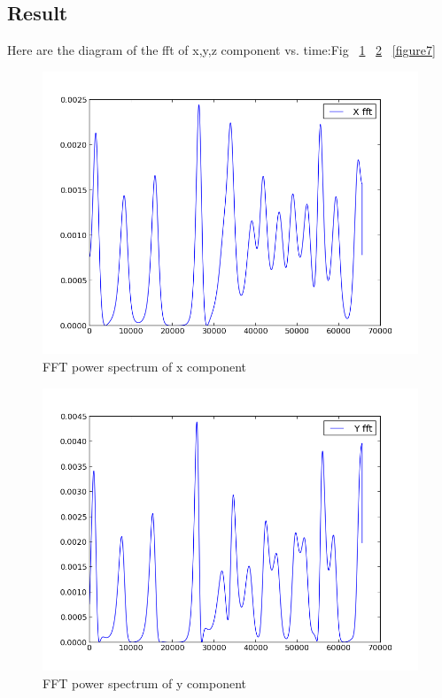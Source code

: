 \documentclass[11pt,letterpaper]{article}
\begin{document}
\subsection{Result}

Here are the diagram of the fft of x,y,z component vs. time:Fig ~\ref{figure5} ~\ref{figure6} ~\ref{figure7}


\begin{figure}
\begin{center}
\includegraphics[width=0.8\linewidth,angle=0]{fftx.png}
\caption{FFT power spectrum of x component}
\label{figure5}
\end{center}
\end{figure}

\begin{figure}
\begin{center}
\includegraphics[width=0.8\linewidth,angle=0]{ffty.png}
\caption{FFT power spectrum of y component}
\label{figure6}
\end{center}
\end{figure}
\end{document}
